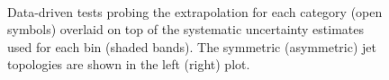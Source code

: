 \begin{figure}[h!]
  \begin{center}
    ~~
    \caption{Data-driven tests probing the \bdphi extrapolation for each
      \njet category (open symbols) overlaid on top of the systematic
      uncertainty estimates used for each \scalht bin (shaded bands). 
      The symmetric (asymmetric) jet topologies are shown in the left (right) plot. 
    }
    \label{fig:closure_bdphi}
  \end{center} 
\end{figure}

